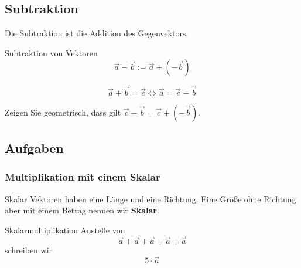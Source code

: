 

\newpage


\subsection{Subtraktion}

Die Subtraktion ist die Addition des Gegenvektors:

\begin{definition}{Subtraktion von Vektoren}{}
  $$\vec{a} - \vec{b} := \vec{a} + (-\vec{b})$$
\end{definition}

\begin{bemerkung}{}{}
  $$\vec{a} + \vec{b} = \vec{c} \Longleftrightarrow \vec{a} = \vec{c} - \vec{b}$$
\end{bemerkung}

Zeigen Sie geometrisch, dass gilt $\vec{c} - \vec{b} = \vec{c} +
(-\vec{b})$.


\subsection*{Aufgaben}
\newpage


\subsubsection{Multiplikation mit einem Skalar}
\begin{definition}{Skalar}{}
  Vektoren haben eine Länge und eine Richtung. Eine Größe ohne
  Richtung aber mit einem Betrag nennen wir \textbf{Skalar}. 
\end{definition}

\begin{beispiel}{Skalarmultiplikation}{}
  Anstelle von
  $$\vec{a}+\vec{a}+\vec{a}+\vec{a}+\vec{a}$$
  schreiben wir
  $$5\cdot{}\vec{a}$$
\end{beispiel}

